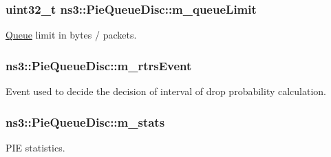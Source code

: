 \subsubsection[{\texorpdfstring{m\+\_\+queue\+Limit}{m_queueLimit}}]{\setlength{\rightskip}{0pt plus 5cm}uint32\+\_\+t ns3\+::\+Pie\+Queue\+Disc\+::m\+\_\+queue\+Limit\hspace{0.3cm}{\ttfamily [private]}}\hypertarget{classns3_1_1PieQueueDisc_ad5a24ff6288913559429261d124db5eb}{}\label{classns3_1_1PieQueueDisc_ad5a24ff6288913559429261d124db5eb}


\hyperlink{classns3_1_1Queue}{Queue} limit in bytes / packets. 

\subsubsection[{\texorpdfstring{m\+\_\+rtrs\+Event}{m_rtrsEvent}}]{ ns3\+::\+Pie\+Queue\+Disc\+::m\+\_\+rtrs\+Event\hspace{0.3cm}{\ttfamily [private]}}\hypertarget{classns3_1_1PieQueueDisc_a409e9d3bef27ea85fddd32048ea12f6f}{}\label{classns3_1_1PieQueueDisc_a409e9d3bef27ea85fddd32048ea12f6f}


Event used to decide the decision of interval of drop probability calculation. 

\subsubsection[{\texorpdfstring{m\+\_\+stats}{m_stats}}]{ ns3\+::\+Pie\+Queue\+Disc\+::m\+\_\+stats\hspace{0.3cm}{\ttfamily [private]}}\hypertarget{classns3_1_1PieQueueDisc_a962196aaa98c57732483f1296347c61c}{}\label{classns3_1_1PieQueueDisc_a962196aaa98c57732483f1296347c61c}


P\+IE statistics. 

